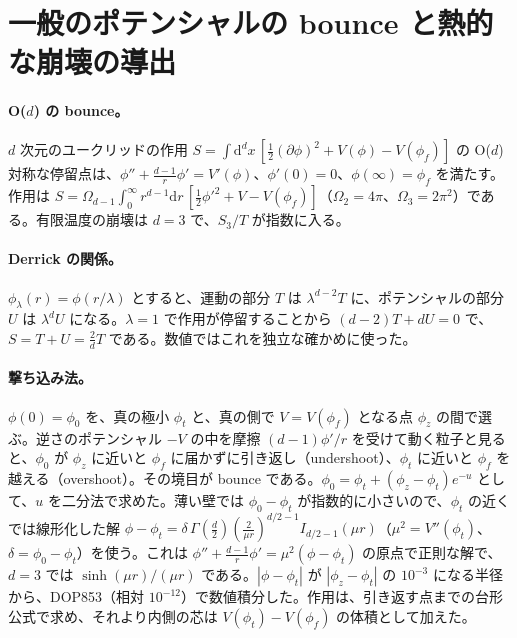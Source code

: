 \documentclass[a4paper,10pt]{ltjsarticle}
\newcommand{\dd}{\mathrm{d}}
\begin{document}
\section{一般のポテンシャルの bounce と熱的な崩壊の導出}\label{app:bounce}

\paragraph{O($d$) の bounce。}$d$ 次元のユークリッドの作用 $S=\int\dd^dx\,[\frac12(\partial\phi)^2+V(\phi)-V(\phi_f)]$ の O($d$) 対称な停留点は、$\phi''+\frac{d-1}r\phi'=V'(\phi)$、$\phi'(0)=0$、$\phi(\infty)=\phi_f$ を満たす。作用は $S=\Omega_{d-1}\int_0^\infty r^{d-1}\dd r\,[\frac12\phi'^2+V-V(\phi_f)]$（$\Omega_2=4\pi$、$\Omega_3=2\pi^2$）である。有限温度の崩壊は $d=3$ で、$S_3/T$ が指数に入る。

\paragraph{Derrick の関係。}$\phi_\lambda(r)=\phi(r/\lambda)$ とすると、運動の部分 $T$ は $\lambda^{d-2}T$ に、ポテンシャルの部分 $U$ は $\lambda^dU$ になる。$\lambda=1$ で作用が停留することから $(d-2)T+dU=0$ で、$S=T+U=\frac2dT$ である。数値ではこれを独立な確かめに使った。

\paragraph{撃ち込み法。}$\phi(0)=\phi_0$ を、真の極小 $\phi_t$ と、真の側で $V=V(\phi_f)$ となる点 $\phi_z$ の間で選ぶ。逆さのポテンシャル $-V$ の中を摩擦 $(d-1)\phi'/r$ を受けて動く粒子と見ると、$\phi_0$ が $\phi_z$ に近いと $\phi_f$ に届かずに引き返し（undershoot）、$\phi_t$ に近いと $\phi_f$ を越える（overshoot）。その境目が bounce である。$\phi_0=\phi_t+(\phi_z-\phi_t)e^{-u}$ として、$u$ を二分法で求めた。薄い壁では $\phi_0-\phi_t$ が指数的に小さいので、$\phi_t$ の近くでは線形化した解 $\phi-\phi_t=\delta\,\Gamma(\frac d2)(\frac2{\mu r})^{d/2-1}I_{d/2-1}(\mu r)$（$\mu^2=V''(\phi_t)$、$\delta=\phi_0-\phi_t$）を使う。これは $\phi''+\frac{d-1}r\phi'=\mu^2(\phi-\phi_t)$ の原点で正則な解で、$d=3$ では $\sinh(\mu r)/(\mu r)$ である。$|\phi-\phi_t|$ が $|\phi_z-\phi_t|$ の $10^{-3}$ になる半径から、DOP853（相対 $10^{-12}$）で数値積分した。作用は、引き返す点までの台形公式で求め、それより内側の芯は $V(\phi_t)-V(\phi_f)$ の体積として加えた。
\end{document}
